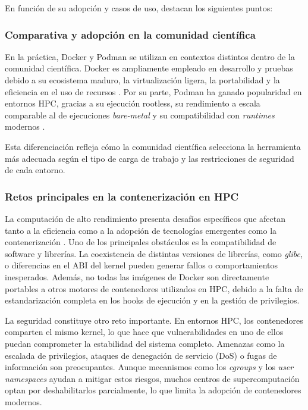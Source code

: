 En función de su adopción y casos de uso, destacan los siguientes puntos:

\subsubsection{Comparativa y adopción en la comunidad científica}

En la práctica, Docker y Podman se utilizan en contextos distintos dentro de la comunidad científica. Docker es ampliamente empleado en desarrollo y pruebas debido a su ecosistema maduro, la virtualización ligera, la portabilidad y la eficiencia en el uso de recursos \cite{Bhatia2017THERT}. Por su parte, Podman ha ganado popularidad en entornos HPC, gracias a su ejecución rootless, su rendimiento a escala comparable al de ejecuciones \textit{bare-metal} y su compatibilidad con \textit{runtimes} modernos \cite{gantikow2020rootless, stephey2022scaling}.

Esta diferenciación refleja cómo la comunidad científica selecciona la herramienta más adecuada según el tipo de carga de trabajo y las restricciones de seguridad de cada entorno.

\subsubsection{Retos principales en la contenerización en HPC}

La computación de alto rendimiento presenta desafíos específicos que afectan tanto a la eficiencia como a la adopción de tecnologías emergentes como la contenerización \cite{zhou2022containerisation}. Uno de los principales obstáculos es la compatibilidad de software y librerías. La coexistencia de distintas versiones de librerías, como \textit{glibc}, o diferencias en el ABI del kernel pueden generar fallos o comportamientos inesperados. Además, no todas las imágenes de Docker son directamente portables a otros motores de contenedores utilizados en HPC, debido a la falta de estandarización completa en los hooks de ejecución y en la gestión de privilegios.

La seguridad constituye otro reto importante. En entornos HPC, los contenedores comparten el mismo kernel, lo que hace que vulnerabilidades en uno de ellos puedan comprometer la estabilidad del sistema completo. Amenazas como la escalada de privilegios, ataques de denegación de servicio (DoS) o fugas de información son preocupantes. Aunque mecanismos como los \textit{cgroups} y los \textit{user namespaces} ayudan a mitigar estos riesgos, muchos centros de supercomputación optan por deshabilitarlos parcialmente, lo que limita la adopción de contenedores modernos.

